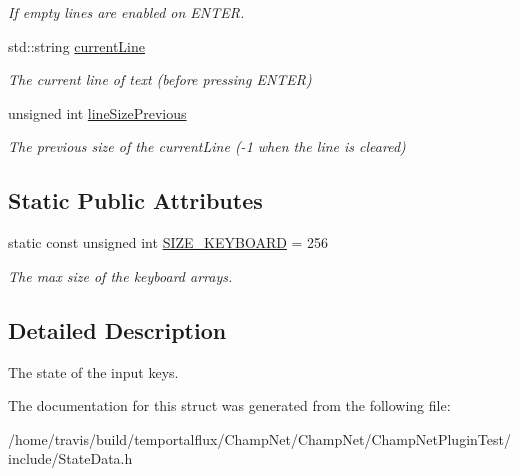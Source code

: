 \begin{DoxyCompactItemize}
\begin{DoxyCompactList}\small\item\em If empty lines are enabled on E\-N\-T\-E\-R. \end{DoxyCompactList}\item 
\hypertarget{struct_state_input_a5ce1360c9195f7dfe700e9398b9c8e7b}{std\-::string \hyperlink{struct_state_input_a5ce1360c9195f7dfe700e9398b9c8e7b}{current\-Line}}\label{struct_state_input_a5ce1360c9195f7dfe700e9398b9c8e7b}

\begin{DoxyCompactList}\small\item\em The current line of text (before pressing E\-N\-T\-E\-R) \end{DoxyCompactList}\item 
\hypertarget{struct_state_input_ab6d707a36eabe343d0b46838773da8f9}{unsigned int \hyperlink{struct_state_input_ab6d707a36eabe343d0b46838773da8f9}{line\-Size\-Previous}}\label{struct_state_input_ab6d707a36eabe343d0b46838773da8f9}

\begin{DoxyCompactList}\small\item\em The previous size of the current\-Line (-\/1 when the line is cleared) \end{DoxyCompactList}\end{DoxyCompactItemize}
\subsection*{Static Public Attributes}
\begin{DoxyCompactItemize}
\item 
\hypertarget{struct_state_input_acc91adb5a30e828f5fd4be0228a09040}{static const unsigned int \hyperlink{struct_state_input_acc91adb5a30e828f5fd4be0228a09040}{S\-I\-Z\-E\-\_\-\-K\-E\-Y\-B\-O\-A\-R\-D} = 256}\label{struct_state_input_acc91adb5a30e828f5fd4be0228a09040}

\begin{DoxyCompactList}\small\item\em The max size of the keyboard arrays. \end{DoxyCompactList}\end{DoxyCompactItemize}


\subsection{Detailed Description}
The state of the input keys. 

The documentation for this struct was generated from the following file\-:\begin{DoxyCompactItemize}
\item 
/home/travis/build/temportalflux/\-Champ\-Net/\-Champ\-Net/\-Champ\-Net\-Plugin\-Test/include/State\-Data.\-h\end{DoxyCompactItemize}
